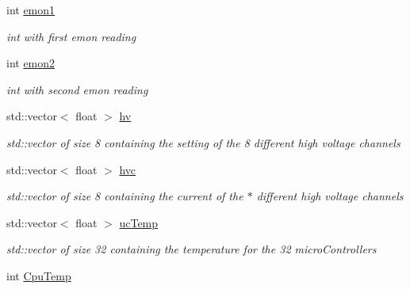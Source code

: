 \begin{DoxyCompactItemize}
\mbox{\label{classIEvent_a0fb1f3acc602af4fbce665f4c8c53c51}} 
int \hyperlink{classIEvent_a0fb1f3acc602af4fbce665f4c8c53c51}{emon1}
\begin{DoxyCompactList}\small\item\em int with first emon reading \end{DoxyCompactList}\item 
\mbox{\label{classIEvent_ac3fb249684166a64a82c718dcc6014d3}} 
int \hyperlink{classIEvent_ac3fb249684166a64a82c718dcc6014d3}{emon2}
\begin{DoxyCompactList}\small\item\em int with second emon reading \end{DoxyCompactList}\item 
\mbox{\label{classIEvent_a87f3d87db239c5d8f2e3ee4705dd1bb0}} 
std\+::vector$<$ float $>$ \hyperlink{classIEvent_a87f3d87db239c5d8f2e3ee4705dd1bb0}{hv}
\begin{DoxyCompactList}\small\item\em std\+::vector of size 8 containing the setting of the 8 different high voltage channels \end{DoxyCompactList}\item 
\mbox{\label{classIEvent_a29302020da886e4d750f4466b9b25b61}} 
std\+::vector$<$ float $>$ \hyperlink{classIEvent_a29302020da886e4d750f4466b9b25b61}{hvc}
\begin{DoxyCompactList}\small\item\em std\+::vector of size 8 containing the current of the $\ast$ different high voltage channels \end{DoxyCompactList}\item 
\mbox{\label{classIEvent_a8f69f5d69200e97681be52132fce328c}} 
std\+::vector$<$ float $>$ \hyperlink{classIEvent_a8f69f5d69200e97681be52132fce328c}{uc\+Temp}
\begin{DoxyCompactList}\small\item\em std\+::vector of size 32 containing the temperature for the 32 micro\+Controllers \end{DoxyCompactList}\item 
\mbox{\label{classIEvent_a0373b3c3c7c5c164bd3f3c9d97ab3147}} 
int \hyperlink{classIEvent_a0373b3c3c7c5c164bd3f3c9d97ab3147}{Cpu\+Temp}

\end{DoxyCompactItemize}
